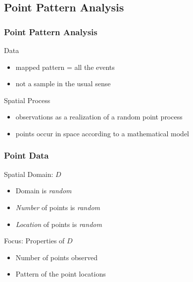 \documentclass[nototal]{beamer}
\begin{document}
  \subsection{Point Pattern Analysis}
  \begin{frame}
    \frametitle{Point Pattern Analysis}
    \begin{block}{Data}
      \begin{itemize}
	\item mapped pattern = all the events
	\item not a sample in the usual sense
      \end{itemize}
     \end{block}
    \begin{block}{Spatial Process}
      \begin{itemize}
	\item observations as a realization of a random point process
	\item points occur in space according to a mathematical model 
      \end{itemize}
     \end{block}
   \end{frame}
   \begin{frame}
     \frametitle{Point Data}
     \begin{block}{Spatial Domain: $D$}
       \begin{itemize}
	 \item Domain is \emph{random}
	 \item \emph{Number} of points is \emph{random}
	 \item \emph{Location} of points is \emph{random}
       \end{itemize}
      \end{block}
      \begin{block}{Focus: Properties of $D$}
	\begin{itemize}
	  \item Number of points observed
	  \item Pattern of the point locations
	\end{itemize}
      \end{block}
    \end{frame}
\end{document}
